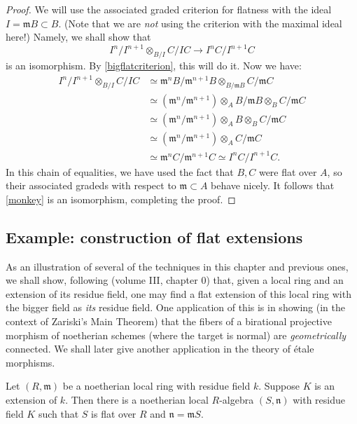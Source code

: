\begin{proof} 
We will use the associated graded criterion for flatness with the ideal
$I = \mathfrak{m}B \subset B$. (Note that we are \emph{not} using the criterion
with the maximal ideal here!) Namely, we shall show
that
\begin{equation} \label{monkey}  I^n/I^{n+1} \otimes_{B/I} C/IC \to I^n
C/I^{n+1}C \end{equation}
is an isomorphism. By \cref{bigflatcriterion}, this will do it. Now we have: 
\begin{align*}  
 I^n/I^{n+1} \otimes_{B/I} C/IC & \simeq 
\mathfrak{m}^nB/\mathfrak{m}^{n+1}B \otimes_{B/\mathfrak{m}B}
C/\mathfrak{m}C  \\ & \simeq
(\mathfrak{m}^n/\mathfrak{m}^{n+1})\otimes_{A} B/\mathfrak{m}B \otimes_B
C/\mathfrak{m}C  \\
& \simeq (\mathfrak{m}^n/\mathfrak{m}^{n+1})\otimes_{A} B \otimes_B
C/\mathfrak{m}C \\
& \simeq (\mathfrak{m}^n/\mathfrak{m}^{n+1})\otimes_{A} C/\mathfrak{m}C \\
& \simeq \mathfrak{m}^nC/\mathfrak{m}^{n+1} C \simeq I^n C/I^{n+1}C.
\end{align*}
In this chain of equalities, we have used the fact that $B, C$ were flat over
$A$, so their associated gradeds with respect to $\mathfrak{m} \subset A$
behave nicely. It follows that \eqref{monkey} is an isomorphism, completing the
proof.
\end{proof} 
\subsection{Example: construction of flat extensions}

As an illustration of several of the techniques in this chapter and previous
ones, we shall show, following \cite{EGA} (volume III, chapter 0) that, given a
local ring and an extension of its residue field, one may find a flat
extension of this local ring with the bigger field as \emph{its} residue
field. One application of this is in showing (in the context of Zariski's
Main Theorem) that the fibers of a birational
projective morphism of noetherian schemes (where the target is normal) are
\emph{geometrically} connected.
We shall later give another application in the theory of \'etale morphisms.

\begin{theorem} 
Let $(R, \mathfrak{m})$ be a noetherian local ring with residue field $k$.
Suppose $K$ is an extension of $k$. Then there is a noetherian local
$R$-algebra $(S,
\mathfrak{n})$ with residue field $K$ such that $S$ is flat over $R$ and $\mathfrak{n} =
\mathfrak{m}S$.
\end{theorem} 

